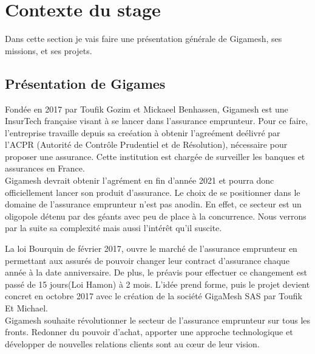 
\chapter{Contexte du stage} %

\label{Chaptre1} %

Dans cette section je vais faire une présentation générale de Gigamesh, ses missions, et ses projets.


\newcommand{\keyword}[1]{\textbf{#1}}
\newcommand{\tabhead}[1]{\textbf{#1}}
\newcommand{\code}[1]{\texttt{#1}}
\newcommand{\file}[1]{\texttt{\bfseries#1}}
\newcommand{\option}[1]{\texttt{\itshape#1}}

\section{Présentation de Gigames}

Fondée en 2017 par Toufik Gozim et Mickaeel Benhassen, Gigamesh est une InsurTech française visant à se lancer dans l’assurance emprunteur. Pour ce faire, l’entreprise travaille depuis sa creéation à obtenir l’agreément deélivré par l’ACPR (Autorité de Contrôle Prudentiel et de Résolution), nécessaire pour proposer une assurance. Cette institution est chargée de surveiller les banques et assurances en France.				
\\

Gigamesh devrait obtenir l’agrément en fin d’année 2021 et pourra donc officiellement lancer son produit d’assurance. Le choix de se positionner dans le domaine de l’assurance emprunteur n’est pas anodin. En effet, ce secteur est un oligopole détenu par des géants avec peu de place à la concurrence. Nous verrons par la suite sa complexité mais aussi l’intérêt qu’il suscite.

La loi Bourquin de février 2017, ouvre le marché de l'assurance emprunteur en permettant aux assurés de pouvoir changer leur contract d'assurance chaque année à la date anniversaire. De plus, le préavis pour effectuer ce changement est passé de 15 jours(Loi Hamon) à 2 mois. L'idée prend forme, puis le projet devient concret en octobre 2017 avec le création de la société GigaMesh SAS par Toufik Et Michael.
\\	
Gigamesh souhaite révolutionner le secteur de l’assurance emprunteur sur tous les fronts. Redonner du pouvoir d’achat, apporter une approche technologique et développer de nouvelles relations clients sont au cœur de leur vision. 



